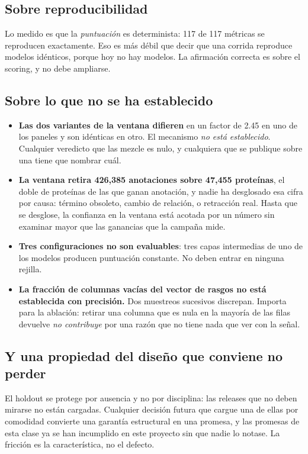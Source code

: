 \subsection{Sobre reproducibilidad}

Lo medido es que la \emph{puntuación} es determinista: 117 de 117 métricas se
reproducen exactamente. Eso es más débil que decir que una corrida reproduce
modelos idénticos, porque hoy no hay modelos. La afirmación correcta es sobre el
scoring, y no debe ampliarse.

\subsection{Sobre lo que no se ha establecido}

\begin{itemize}[leftmargin=1.4em,itemsep=0.3em]
  \item \textbf{Las dos variantes de la ventana difieren} en un factor de 2.45 en
        uno de los paneles y son idénticas en otro. El mecanismo \emph{no está
        establecido}. Cualquier veredicto que las mezcle es nulo, y cualquiera que
        se publique sobre una tiene que nombrar cuál.
  \item \textbf{La ventana retira 426{,}385 anotaciones sobre 47{,}455 proteínas},
        el doble de proteínas de las que ganan anotación, y nadie ha desglosado esa
        cifra por causa: término obsoleto, cambio de relación, o retracción real.
        Hasta que se desglose, la confianza en la ventana está acotada por un número
        sin examinar mayor que las ganancias que la campaña mide.
  \item \textbf{Tres configuraciones no son evaluables}: tres capas intermedias de
        uno de los modelos producen puntuación constante. No deben entrar en ninguna
        rejilla.
  \item \textbf{La fracción de columnas vacías del vector de rasgos no está
        establecida con precisión.} Dos muestreos sucesivos discrepan. Importa para
        la ablación: retirar una columna que es nula en la mayoría de las filas
        devuelve \emph{no contribuye} por una razón que no tiene nada que ver con la
        señal.
\end{itemize}

\subsection{Y una propiedad del diseño que conviene no perder}

El holdout se protege por ausencia y no por disciplina: las releases que no deben
mirarse no están cargadas. Cualquier decisión futura que cargue una de ellas por
comodidad convierte una garantía estructural en una promesa, y las promesas de esta
clase ya se han incumplido en este proyecto sin que nadie lo notase. La fricción es
la característica, no el defecto.
